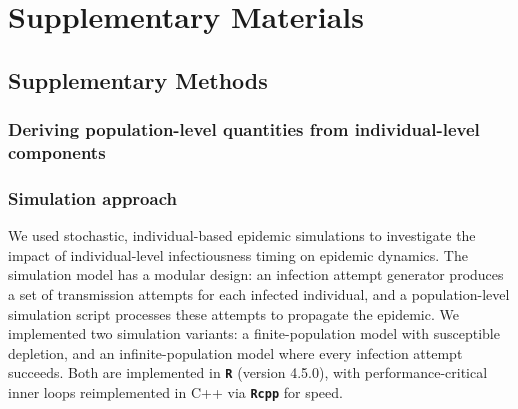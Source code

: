 \section{Supplementary Materials}
\subsection{Supplementary Methods}

\subsubsection{Deriving population-level quantities from individual-level components}

\subsubsection{Simulation approach}

We used stochastic, individual-based epidemic simulations to investigate the impact of individual-level infectiousness timing on epidemic dynamics. The simulation model has a modular design: an infection attempt generator produces a set of transmission attempts for each infected individual, and a population-level simulation script processes these attempts to propagate the epidemic. We implemented two simulation variants: a finite-population model with susceptible depletion, and an infinite-population model where every infection attempt succeeds. Both are implemented in {\bf \texttt{R}} (version 4.5.0), with performance-critical inner loops reimplemented in C++ via {\bf \texttt{Rcpp}} for speed.

